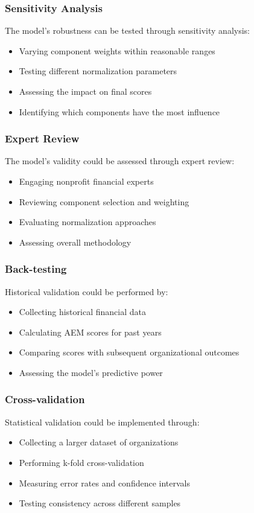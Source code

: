 \documentclass[12pt]{article}
\begin{document}
\subsubsection{Sensitivity Analysis}
The model's robustness can be tested through sensitivity analysis:
\begin{itemize}
    \item Varying component weights within reasonable ranges
    \item Testing different normalization parameters
    \item Assessing the impact on final scores
    \item Identifying which components have the most influence
\end{itemize}

\subsubsection{Expert Review}
The model's validity could be assessed through expert review:
\begin{itemize}
    \item Engaging nonprofit financial experts
    \item Reviewing component selection and weighting
    \item Evaluating normalization approaches
    \item Assessing overall methodology
\end{itemize}

\subsubsection{Back-testing}
Historical validation could be performed by:
\begin{itemize}
    \item Collecting historical financial data
    \item Calculating AEM scores for past years
    \item Comparing scores with subsequent organizational outcomes
    \item Assessing the model's predictive power
\end{itemize}

\subsubsection{Cross-validation}
Statistical validation could be implemented through:
\begin{itemize}
    \item Collecting a larger dataset of organizations
    \item Performing k-fold cross-validation
    \item Measuring error rates and confidence intervals
    \item Testing consistency across different samples
\end{itemize}
\end{document}
